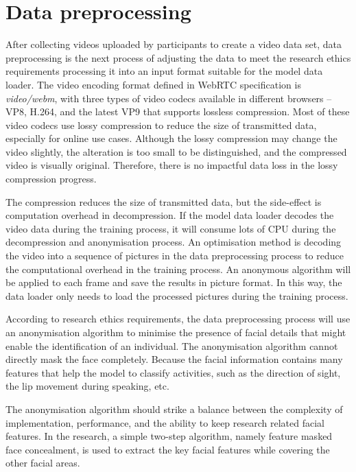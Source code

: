 \section{Data preprocessing}
\label{sec:Data preprocessing} %
After collecting videos uploaded by participants to create a video data set, data preprocessing is the next process of adjusting the data to meet the research ethics requirements processing it into an input format suitable for the model data loader.
The video encoding format defined in WebRTC specification is \textit{video/webm}, with three types of video codecs available in different browsers -- VP8, H.264, and the latest VP9 that supports lossless compression.
Most of these video codecs use lossy compression to reduce the size of transmitted data, especially for online use cases.
Although the lossy compression may change the video slightly, the alteration is too small to be distinguished, and the compressed video is visually original.
Therefore, there is no impactful data loss in the lossy compression progress.

The compression reduces the size of transmitted data, but the side-effect is computation overhead in decompression.
If the model data loader decodes the video data during the training process, it will consume lots of CPU during the decompression and anonymisation process.
An optimisation method is decoding the video into a sequence of pictures in the data preprocessing process to reduce the computational overhead in the training process.
An anonymous algorithm will be applied to each frame and save the results in picture format.
In this way, the data loader only needs to load the processed pictures during the training process.

According to research ethics requirements, the data preprocessing process will use an anonymisation algorithm to minimise the presence of facial details that might enable the identification of an individual.
The anonymisation algorithm cannot directly mask the face completely.
Because the facial information contains many features that help the model to classify activities, such as the direction of sight, the lip movement during speaking, etc.

The anonymisation algorithm should strike a balance between the complexity of implementation, performance, and the ability to keep research related facial features.
In the research, a simple two-step algorithm, namely feature masked face concealment, is used to extract the key facial features while covering the other facial areas.

